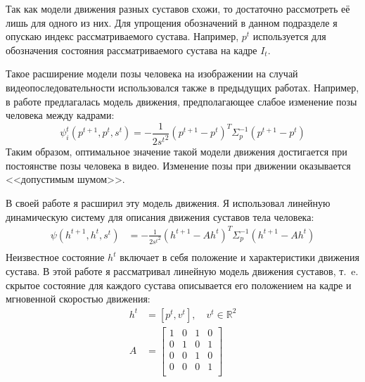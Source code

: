 Так как модели движения разных суставов схожи, то достаточно рассмотреть её лишь для одного из них. Для упрощения обозначений в данном подразделе я опускаю индекс рассматриваемого сустава. Например, $p^t$ используется для обозначения состояния рассматриваемого сустава на кадре $I_t$.

Такое расширение модели позы человека на изображении на случай видеопоследовательности использовался также в предыдущих работах. Например, в работе \cite{park2011n} предлагалась модель движения, предполагающее слабое изменение позы человека между кадрами:
\begin{equation*}
	\psi_i^t(p^{t+1}, p^t, s^t) = -\frac{1} {2 {s^t}^2}(p^{t+1} - p^t)^T \Sigma_p^{-1} (p^{t+1} - p^t)
\end{equation*}
Таким образом, оптимальное значение такой модели движения достигается при постоянстве позы человека в видео. Изменение позы при движении оказывается <<допустимым шумом>>.

В своей работе я расширил эту модель движения. Я использовал линейную динамическую систему для описания движения суставов тела человека:
\begin{equation}
	\begin{aligned}
		\psi(h^{t+1}, h^{t}, s^{t}) &=
			-\frac{1}{2 {s^t}^2} (h^{t+1} - A h^t)^T \Sigma_p^{-1} (h^{t+1} - A h^t) \\
	\end{aligned}
	\label{eq::temp}
\end{equation}
Неизвестное состояние $h^t$ включает в себя положение и характеристики движения сустава. В этой работе я рассматривал линейную модель движения суставов, т.~e. скрытое состояние для каждого сустава описывается его положением на кадре и мгновенной скоростью движения:
\begin{equation}
	\begin{aligned}
		h^t &= \left[p^t, v^t\right], \quad v^t \in \mathbb{R}^2\\
		A &=
			\begin{bmatrix}
			1 & 0 & 1 & 0 \\
			0 & 1 & 0 & 1 \\
			0 & 0 & 1 & 0 \\
			0 & 0 & 0 & 1 \\
			\end{bmatrix} \\
	\end{aligned}
\end{equation}

